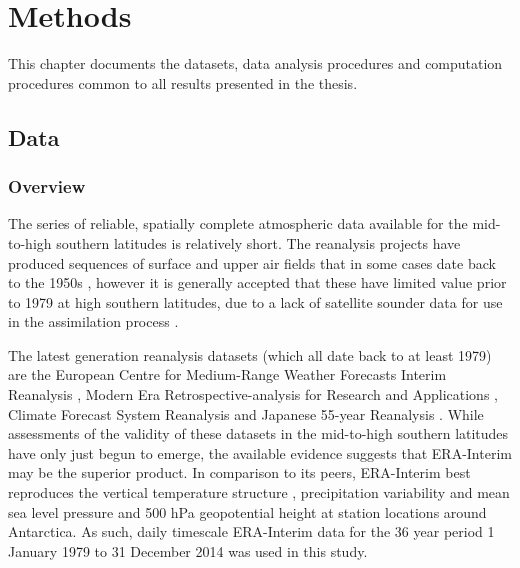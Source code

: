 
\chapter{Methods}\label{c:methods}


\begin{synopsis}
This chapter documents the datasets, data analysis procedures and computation procedures common to all results presented in the thesis.
\end{synopsis}

\section{Data}\label{s:data}


\subsection{Overview}

The series of reliable, spatially complete atmospheric data available for the mid-to-high southern latitudes is relatively short. The reanalysis projects have produced sequences of surface and upper air fields that in some cases date back to the 1950s \citep{Kistler2001,Uppala2005,Kobayashi2015}, however it is generally accepted that these have limited value prior to 1979 at high southern latitudes, due to a lack of satellite sounder data for use in the assimilation process \citep{Hines2000}.

The latest generation reanalysis datasets (which all date back to at least 1979) are the European Centre for Medium-Range Weather Forecasts Interim Reanalysis \citep[ERA-Interim;][]{Dee2011}, Modern Era Retrospective-analysis for Research and Applications \citep[Merra;][]{Rienecker2011}, Climate Forecast System Reanalysis \citep[CFSR;][]{Saha2010} and Japanese 55-year Reanalysis \citep[JRA-55;][]{Kobayashi2015}. While assessments of the validity of these datasets in the mid-to-high southern latitudes have only just begun to emerge, the available evidence suggests that ERA-Interim may be the superior product. In comparison to its peers, ERA-Interim best reproduces the vertical temperature structure \citep{Screen2012}, precipitation variability \citep{Bromwich2011,Nicolas2011} and mean sea level pressure and 500 hPa geopotential height at station locations \citep{Bracegirdle2012} around Antarctica. As such, daily timescale ERA-Interim data for the 36 year period 1 January 1979 to 31 December 2014 was used in this study.

